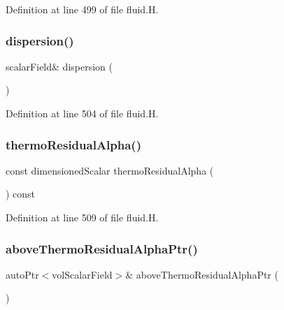Definition at line 499 of file fluid.\+H.

\mbox{\label{classFoam_1_1fluid_a459bc822e6bc0ef6ace0322c601a83a6}} 
\subsubsection{\texorpdfstring{dispersion()}{dispersion()}\hspace{0.1cm}{\footnotesize\ttfamily [2/2]}}
{\footnotesize\ttfamily scalar\+Field\& dispersion (\begin{DoxyParamCaption}{ }\end{DoxyParamCaption})\hspace{0.3cm}{\ttfamily [inline]}}



Definition at line 504 of file fluid.\+H.

\mbox{\label{classFoam_1_1fluid_ac105f8326bfcc36ca996ff7e0664fc1f}} 
\subsubsection{\texorpdfstring{thermo\+Residual\+Alpha()}{thermoResidualAlpha()}}
{\footnotesize\ttfamily const dimensioned\+Scalar thermo\+Residual\+Alpha (\begin{DoxyParamCaption}{ }\end{DoxyParamCaption}) const\hspace{0.3cm}{\ttfamily [inline]}}



Definition at line 509 of file fluid.\+H.

\mbox{\label{classFoam_1_1fluid_a6225759734aac460a750b7ea2606458d}} 
\subsubsection{\texorpdfstring{above\+Thermo\+Residual\+Alpha\+Ptr()}{aboveThermoResidualAlphaPtr()}}
{\footnotesize\ttfamily auto\+Ptr$<$vol\+Scalar\+Field$>$\& above\+Thermo\+Residual\+Alpha\+Ptr (\begin{DoxyParamCaption}{ }\end{DoxyParamCaption})\hspace{0.3cm}{\ttfamily [inline]}}



